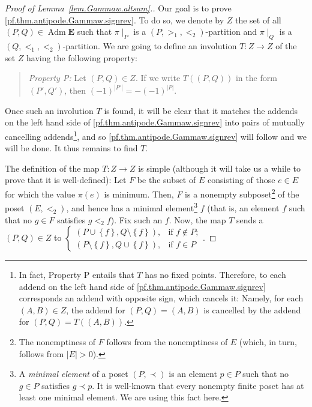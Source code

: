 \documentclass[12pt]{article}
\theoremstyle{plain}
\theoremstyle{definition}
\theoremstyle{remark}
\newenvironment{statement}{\begin{quote}}{\end{quote}}
\newcommand{\Adm}{\operatorname{Adm}}
\newcommand{\EE}{{\mathbf{E}}}
\begin{document}
\begin{proof}[Proof of Lemma~\ref{lem.Gammaw.altsum}.]

Our goal is to prove \eqref{pf.thm.antipode.Gammaw.signrev}.
To do so, we denote by $Z$ the set of all
$\left(P, Q\right) \in \Adm \EE$ such that
$\pi\mid_P$ is a $\left(P, >_1, <_2\right)$-partition and
$\pi\mid_Q$ is a $\left(Q, <_1, <_2\right)$-partition. We are going
to define an involution $T : Z \to Z$ of the set $Z$ having the
following property:
\begin{statement}
\textit{Property P:} Let $\left(P, Q\right) \in Z$. If we write
$T\left(\left(P, Q\right)\right)$ in the form
$\left(P', Q'\right)$, then
$\left(-1\right)^{\left|P'\right|}
= - \left(-1\right)^{\left|P\right|}$.
\end{statement}
Once such an involution $T$
is found, it will be clear that it matches the addends on the left
hand side of \eqref{pf.thm.antipode.Gammaw.signrev} into pairs of
mutually cancelling addends\footnote{In fact, Property P
entails that $T$ has no fixed points. Therefore, to each addend
on the left
hand side of \eqref{pf.thm.antipode.Gammaw.signrev} corresponds an
addend with opposite sign, which cancels it: Namely, for each
$\left(A, B\right) \in Z$, the addend for
$\left(P, Q\right) = \left(A, B\right)$ is cancelled by the addend
for $\left(P, Q\right) = T\left(\left(A, B\right)\right)$.}, and so
\eqref{pf.thm.antipode.Gammaw.signrev}
will follow and we will be done. It thus remains to find $T$.


The definition of the map $T : Z \to Z$
is simple (although it will take us a while to prove
that it is well-defined): Let $F$ be the subset of $E$ consisting of those
$e\in E$ for which the value $\pi \left( e \right)$ is minimum.
Then, $F$ is a nonempty
subposet\footnote{The nonemptiness of $F$ follows from the nonemptiness
of $E$ (which, in turn, follows from $\left|E\right| > 0$).}
of the poset $\left(  E,<_{2}\right)  $, and hence has a minimal
element\footnote{A \textit{minimal element} of a poset
$\left(P, \prec\right)$ is an element $p \in P$ such that no
$g \in P$ satisfies $g \prec p$. It is well-known that every nonempty
finite poset has at least one minimal element. We are using this fact
here.}
$f$ (that is, an element $f$ such that no $g\in F$ satisfies $g<_{2}
f$). Fix such an $f$. Now, the map $T$ sends a $\left(  P,Q\right)  \in Z$ to
$
\begin{cases}
\left(  P\cup\left\{  f\right\}  ,Q\setminus\left\{  f\right\}  \right)  , &
\text{if }f\notin P;\\
\left(  P\setminus\left\{  f\right\}  ,Q\cup\left\{  f\right\}  \right)  , &
\text{if }f\in P
\end{cases}
$.


\end{proof}
\end{document}
